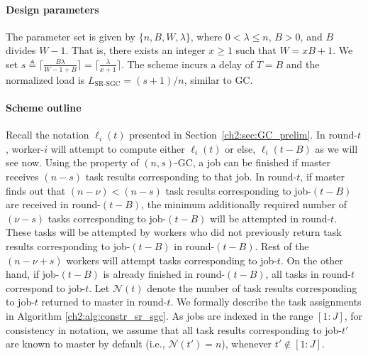 \paragraph{Design parameters}  The parameter set is given by $\{n,B,W,\lambda\}$, where $0<\lambda\leq n$, $B>0$, and $B$ divides $W-1$. That is, there exists an integer $x\geq1$ such that $W=xB+1$. We set $s\triangleq \lceil\frac{B\lambda}{W-1+B}\rceil=\lceil\frac{\lambda}{x+1}\rceil$. The scheme incurs a delay of $T= B$ and the normalized load is $L_\text{SR-SGC}=({s+1})/{n}$, similar to GC.

\paragraph{Scheme outline} Recall the notation $\ell_i(t)$ presented in Section~\ref{ch2:sec:GC_prelim}. In round-$t$, worker-$i$ will attempt to compute either $\ell_i(t)$ or else, $\ell_i(t-B)$ as we will see now. Using the property of $(n,s)$-GC, a job can be finished if master receives $(n-s)$ task results corresponding to that job. In round-$t$, if master finds out that $(n-\nu)<(n-s)$ task results corresponding to job-$(t-B)$ are received in round-$(t-B)$, the minimum additionally required number of $(\nu-s)$ tasks corresponding to job-$(t-B)$ will be attempted in round-$t$. These tasks will be attempted by workers who did not previously return task results corresponding to job-$(t-B)$ in round-$(t-B)$. Rest of the $(n-\nu+s)$ workers will attempt tasks corresponding to job-$t$. On the other hand, if job-$(t-B)$ is already finished in round-$(t-B)$, all tasks in round-$t$ correspond to job-$t$. Let $\mathcal{N}(t)$ denote the number of task results corresponding to job-$t$ returned to master in round-$t$. We formally describe the task assignments in Algorithm \ref{ch2:alg:constr_sr_sgc}. As jobs are indexed in the range $[1:J]$, for consistency in notation, we assume that all task results corresponding to job-$t'$ are known to master by default (i.e., $\mathcal{N}(t')= n$), whenever $t'\notin[1:J]$.


